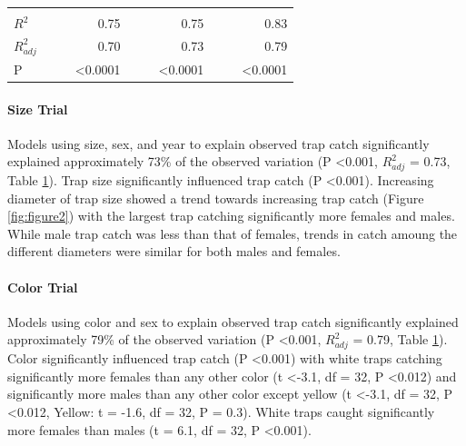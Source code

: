 \documentclass[alpha-refs]{wiley-article}
\begin{document}
\begin{table}[]
\begin{tabular}{lrrrrrrrrr}
              &                       &                        &                       &                       &                        &                       &                       &                        &                       \\
$R^2$            &                       &                        & 0.75                  &                       &                        & 0.75                  &                       &                        & 0.83                  \\
$R^2_{adj}$         &                       &                        & 0.70                  &                       &                        & 0.73                  &                       &                        & 0.79                  \\
P             &                       &                        & \textless 0.0001      &                       &                        & \textless 0.0001      &                       &                        & \textless 0.0001     
\end{tabular}
\label{table:1}
\end{table}



\paragraph{Size Trial} Models using size, sex, and year to explain observed trap catch significantly explained approximately 73\% of the observed variation (P \textless 0.001, $R^2_{adj}$ = 0.73, Table \ref{table:1}).  Trap size significantly influenced trap catch (P \textless 0.001).  Increasing diameter of trap size showed a trend towards increasing trap catch (Figure \ref{fig:figure2}) with the largest trap catching significantly more females and males.  While male trap catch was less than that of females, trends in catch amoung the different diameters were similar for both males and females.  


\paragraph{Color Trial} Models using color and sex to explain observed trap catch significantly explained approximately 79\% of the observed variation (P \textless 0.001, $R^2_{adj}$ = 0.79, Table \ref{table:1}). Color significantly influenced trap catch (P \textless 0.001) with white traps catching significantly more females than any other color (t \textless -3.1, df = 32, P \textless 0.012) and significantly more males than any other color except yellow (t \textless -3.1, df = 32, P \textless 0.012, Yellow: t = -1.6, df = 32, P = 0.3).  White traps caught significantly more females than males (t = 6.1, df = 32, P \textless 0.001).
\end{document}
